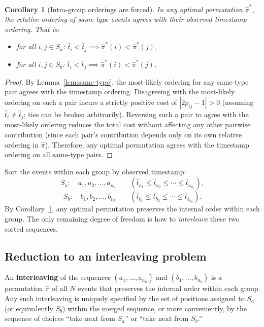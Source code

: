 \documentclass[11pt]{article}
\newtheorem{corollary}[theorem]{Corollary}
\begin{document}
\begin{corollary}[Intra-group orderings are forced]\label{cor:intra-forced}
In any optimal permutation $\hat{\pi}^*$, the relative ordering of same-type events agrees with their observed timestamp ordering. That is:
\begin{itemize}
\item for all $i, j \in S_a$: $\hat{t}_i < \hat{t}_j \implies \hat{\pi}^*(i) < \hat{\pi}^*(j)$,
\item for all $i, j \in S_b$: $\hat{t}_i < \hat{t}_j \implies \hat{\pi}^*(i) < \hat{\pi}^*(j)$.
\end{itemize}
\end{corollary}

\begin{proof}
By Lemma~\ref{lem:same-type}, the most-likely ordering for any same-type pair agrees with the timestamp ordering. Disagreeing with the most-likely ordering on such a pair incurs a strictly positive cost of $|2p_{ij} - 1| > 0$ (assuming $\hat{t}_i \ne \hat{t}_j$; ties can be broken arbitrarily). Reversing such a pair to agree with the most-likely ordering reduces the total cost without affecting any other pairwise contribution (since each pair's contribution depends only on its own relative ordering in $\hat{\pi}$). Therefore, any optimal permutation agrees with the timestamp ordering on all same-type pairs.
\end{proof}

Sort the events within each group by observed timestamp:
\begin{equation}\label{eq:sorted}
S_a: \quad a_1, a_2, \ldots, a_{n_a} \qquad (\hat{t}_{a_1} \le \hat{t}_{a_2} \le \cdots \le \hat{t}_{a_{n_a}}),
\end{equation}
\begin{equation}
S_b: \quad b_1, b_2, \ldots, b_{n_b} \qquad (\hat{t}_{b_1} \le \hat{t}_{b_2} \le \cdots \le \hat{t}_{b_{n_b}}).
\end{equation}
By Corollary~\ref{cor:intra-forced}, any optimal permutation preserves the internal order within each group. The only remaining degree of freedom is how to \emph{interleave} these two sorted sequences.

\subsection{Reduction to an interleaving problem}

An \textbf{interleaving} of the sequences $(a_1, \ldots, a_{n_a})$ and $(b_1, \ldots, b_{n_b})$ is a permutation $\hat{\pi}$ of all $N$ events that preserves the internal order within each group. Any such interleaving is uniquely specified by the set of positions assigned to $S_a$ (or equivalently $S_b$) within the merged sequence, or more conveniently, by the sequence of choices ``take next from $S_a$'' or ``take next from $S_b$.''
\end{document}
